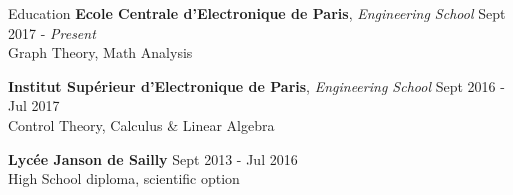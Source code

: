 \documentclass{resume} %
\begin{document}
	
	\begin{rSection}{Education}
		{\bf Ecole Centrale d'Electronique de Paris}, {\em Engineering School} \hfill {Sept 2017 - \em Present}
		\\ Graph Theory, Math Analysis
		
		{\bf Institut Supérieur d'Electronique de Paris}, {\em Engineering School} \hfill {Sept 2016 - Jul 2017}
		\\ Control Theory, Calculus \& Linear Algebra
		
		{\bf Lycée Janson de Sailly} \hfill {Sept 2013 - Jul 2016}
		\\ High School diploma, scientific option
	\end{rSection}
	
	
	
	
\end{document}
